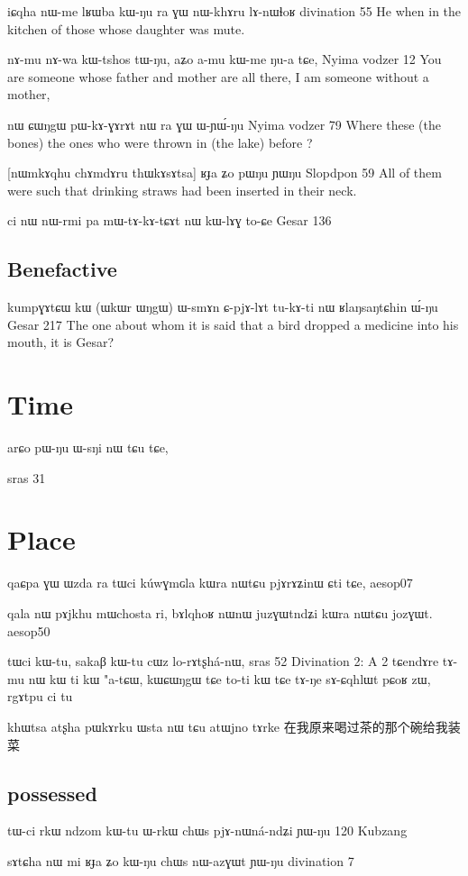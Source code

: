 \documentclass[oldfontcommands,oneside,a4paper,11pt]{memoir}
\newcommand{\wav}[1]{}%
\begin{document}
 iɕqha nɯ-me lʁɯba kɯ-ŋu ra ɣɯ nɯ-khɤru lɤ-nɯɬoʁ
 divination 55
 He when in the kitchen of those whose daughter was mute.
 
nɤ-mu	nɤ-wa	kɯ-tshos	tɯ-ŋu, aʑo	a-mu	kɯ-me	ŋu-a	tɕe,
Nyima vodzer 12
You are someone whose father and mother are all there, I am someone without a mother, 
 
 nɯ	ɕɯŋgɯ	pɯ-kɤ-ɣɤrɤt	nɯ	ra	ɣɯ	ɯ-ɲɯ́-ŋu
 Nyima vodzer 79
Where these (the bones) the ones who were thrown in (the lake) before ?
 
 [nɯmkɤqhu chɤmdɤru thɯkɤsɤtsa] ʁɟa ʑo pɯŋu ɲɯŋu 
 Slopdpon 59
All of them were such that drinking straws had been inserted in their neck.
 
 ci	nɯ	nɯ-rmi	pa	mɯ-tɤ-kɤ-tɕɤt	nɯ	kɯ-lɤɣ	to-ɕe	
 Gesar 136
\subsection{Benefactive}
kumpɣɤtɕɯ	kɯ	(ɯkɯr ɯŋgɯ) ɯ-smɤn	ɕ-pjɤ-lɤt	tu-kɤ-ti nɯ	ʁlaŋsaŋtɕhin	ɯ́-ŋu
Gesar 217
The one about whom it is said that a bird dropped a medicine into his mouth, it is Gesar?

\section{Time}
arɕo pɯ-ŋu ɯ-sŋi nɯ tɕu tɕe,

sras 31


\section{Place}
qaɕpa ɣɯ ɯzda ra tɯci kúwɣmɢla kɯra nɯtɕu pjɤrɤʑinɯ ɕti tɕe, aesop07

qala nɯ pɤjkhu mɯchosta ri, bɤlqhoʁ nɯnɯ juzɣɯtndʑi kɯra nɯtɕu jozɣɯt. aesop50

tɯci kɯ-tu, sakaβ kɯ-tu cɯz lo-rɤtʂhá-nɯ,
sras 52
Divination 2:
A	2	tɕendɤre tɤ-mu nɯ kɯ ti kɯ "a-tɕɯ, kɯɕɯŋgɯ tɕe to-ti kɯ tɕe  tɤ-ŋe sɤ-ɕqhlɯt pɕoʁ zɯ, rgɤtpu ci tu


 khɯtsa atʂha pɯkɤrku ɯsta nɯ tɕu atɯjno tɤrke
 在我原来喝过茶的那个碗给我装菜
\wav{8_Wsta}
\subsection{possessed}
tɯ-ci	rkɯ	ndzom	kɯ-tu	ɯ-rkɯ	chɯs	pjɤ-nɯná-ndʑi	ɲɯ-ŋu
120 Kubzang

sɤtɕha nɯ mi ʁɟa ʑo kɯ-ŋu chɯs nɯ-azɣɯt ɲɯ-ŋu
divination 7
\end{document}
